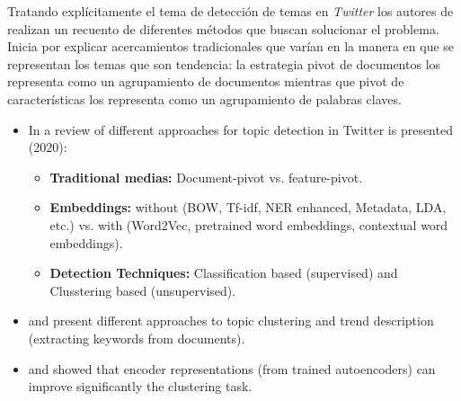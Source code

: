 Tratando explícitamente el tema de detección de temas en \textit{Twitter} los autores de  \cite{ReviewApproachesTopcicDetection} realizan un recuento de diferentes métodos que buscan solucionar el problema. Inicia por explicar acercamientos tradicionales que varían en la manera en que se representan los temas que son tendencia: la estrategia pivot de documentos los representa como un agrupamiento de documentos mientras que pivot de características los representa como un agrupamiento de palabras claves.


\begin{itemize}
    \item In \cite{ReviewApproachesTopcicDetection} a review of different approaches for topic detection in Twitter is presented (2020):
    \begin{itemize}
        \item \textbf{Traditional medias:} Document-pivot vs. feature-pivot.
        
        \item \textbf{Embeddings:} without (BOW, Tf-idf, NER enhanced, Metadata, LDA, etc.) vs. with (Word2Vec, pretrained word embeddings, contextual word embeddings).
        
        \item \textbf{Detection Techniques:} Classification based (supervised) and Clusstering based (unsupervised).
    \end{itemize}
    
\item \cite{TrendTopicsDetectionFromTwitter} and \cite{FuzzyIncrementalTopicDetection} present different approaches to topic clustering and trend description (extracting keywords from documents).
    
\item  \cite{DeepRepresentationClusteringTweets} and \cite{UnsupervisedDeepEmbeddingClustering} showed that encoder representations (from trained autoencoders) can improve significantly the clustering task.
\end{itemize}